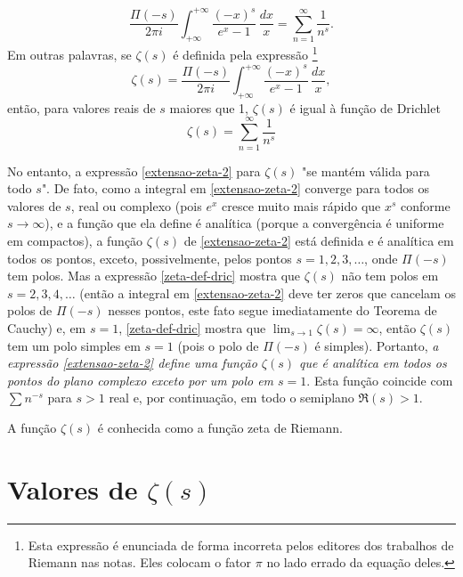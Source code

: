     \begin{equation}
        \label{extensao-zeta-1}
        \frac{\Pi(-s)}{2\pi i} \int_{+\infty}^{+\infty} \frac{(-x)^s}{e^x - 1} \, \frac{dx}{x} = \sum_{n=1}^{\infty}\frac{1}{n^s}.
    \end{equation}
    Em outras palavras, se $\zeta(s)$ é definida pela expressão
    \footnote{
    Esta expressão é enunciada de forma incorreta pelos editores dos trabalhos de Riemann nas notas. Eles colocam o fator $\pi$ no lado errado da equação deles.
    }
    \begin{equation}
        \label{extensao-zeta-2}
        \zeta(s) = \frac{\Pi(-s)}{2\pi i} \int_{+\infty}^{+\infty} \frac{(-x)^s}{e^x - 1} \, \frac{dx}{x},
    \end{equation}
    então, para valores reais de $s$ maiores que 1, $\zeta(s)$ é igual à função de Drichlet
    \begin{equation}
        \label{zeta-def-drich}
        \zeta(s) = \sum_{n=1}^{\infty}\frac{1}{n^s}
    \end{equation}
    
    No entanto, a expressão \eqref{extensao-zeta-2} para $\zeta(s)$ "se mantém válida para todo $s$". De fato, como a integral em \eqref{extensao-zeta-2} converge para todos os valores de $s$, real ou complexo (pois $e^x$ cresce muito mais rápido que $x^s$ conforme $s \to \infty$), e a função que ela define é analítica (porque a convergência é uniforme em compactos), a função $\zeta(s)$ de \eqref{extensao-zeta-2} está definida e é analítica em todos os pontos, exceto, possivelmente, pelos pontos $s = 1, 2, 3, \dots$, onde $\Pi(-s)$ tem polos. Mas a expressão \eqref{zeta-def-dric} mostra que $\zeta(s)$ não tem polos em $s = 2,3,4, \dots$ (então a integral em \eqref{extensao-zeta-2} deve ter zeros que cancelam os polos de $\Pi(-s)$ nesses pontos, este fato segue imediatamente do Teorema de Cauchy) e, em $s = 1$, \eqref{zeta-def-dric} mostra que $\lim_{s \to 1} \zeta(s) = \infty$, então $\zeta(s)$ tem um polo simples em $s=1$ (pois o polo de $\Pi(-s)$ é simples). Portanto, \textit{a expressão \eqref{extensao-zeta-2} define uma função $\zeta(s)$ que é analítica em todos os pontos do plano complexo exceto por um polo em $s = 1$}. Esta função coincide com $\sum n^{-s}$ para $s>1$ real e, por continuação, em todo o semiplano $\Re(s) > 1$.
    
    A função $\zeta(s)$ é conhecida como a função zeta de Riemann.
    
    
    \section*{Valores de $\zeta(s)$}
    
